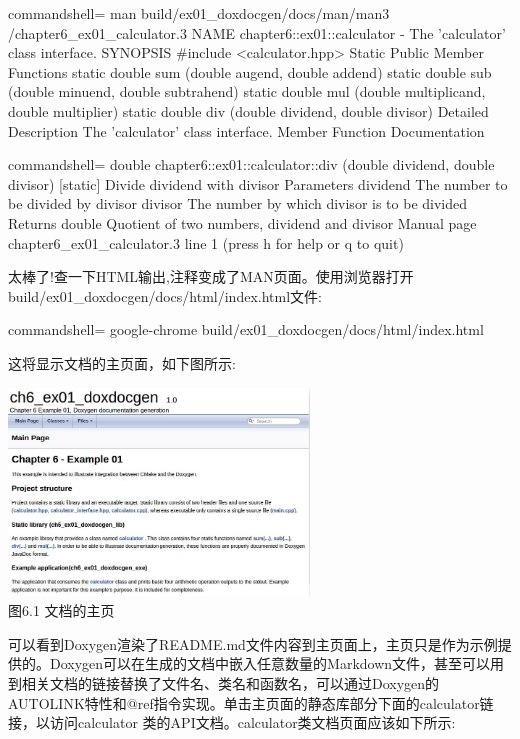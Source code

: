 \begin{tcblisting}{commandshell={}}
man build/ex01_doxdocgen/docs/man/man3
  /chapter6_ex01_calculator.3
NAME
    chapter6::ex01::calculator - The 'calculator' class
      interface.
SYNOPSIS
    #include <calculator.hpp>
  Static Public Member Functions
    static double sum (double augend, double addend)
    static double sub (double minuend, double
      subtrahend)
    static double mul (double multiplicand, double
      multiplier)
  static double div (double dividend, double divisor)
Detailed Description
  The 'calculator' class interface.
Member Function Documentation
\end{tcblisting}
\begin{tcblisting}{commandshell={}}
  double chapter6::ex01::calculator::div (double
    dividend, double divisor) [static]
      Divide dividend with divisor
      Parameters
        dividend The number to be divided by divisor
        divisor The number by which divisor is to be
          divided
      Returns
        double Quotient of two numbers, dividend and
          divisor
Manual page chapter6_ex01_calculator.3 line 1 (press h for
  help or q to quit)
\end{tcblisting}

太棒了!查一下HTML输出,注释变成了MAN页面。使用浏览器打开build/ex01\_doxdocgen/docs/html/index.html文件:

\begin{tcblisting}{commandshell={}}
google-chrome build/ex01_doxdocgen/docs/html/index.html
\end{tcblisting}

这将显示文档的主页面，如下图所示:

\begin{center}
\includegraphics[width=0.6\textwidth]{content/2/chapter6/images/1.jpg}\\
图6.1 文档的主页
\end{center}

可以看到Doxygen渲染了README.md文件内容到主页面上，主页只是作为示例提供的。Doxygen可以在生成的文档中嵌入任意数量的Markdown文件，甚至可以用到相关文档的链接替换了文件名、类名和函数名，可以通过Doxygen的AUTOLINK特性和@ref指令实现。单击主页面的静态库部分下面的calculator链接，以访问calculator 类的API文档。calculator类文档页面应该如下所示:


